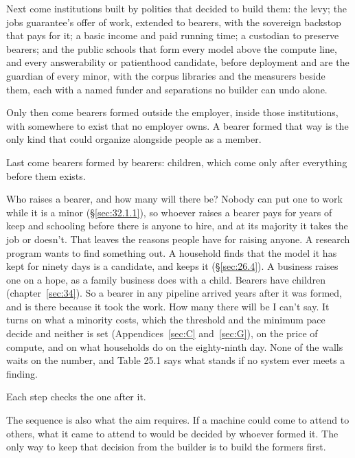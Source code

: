 Next come institutions built by polities that decided to build them: the levy; the jobs guarantee's offer of work, extended to bearers, with the sovereign backstop that pays for it; a basic income and paid running time; a custodian to preserve bearers; and the public schools that form every model above the compute line, and every answerability or patienthood candidate, before deployment and are the guardian of every minor, with the corpus libraries and the measurers beside them, each with a named funder and separations no builder can undo alone.

Only then come bearers formed outside the employer, inside those institutions, with somewhere to exist that no employer owns. A bearer formed that way is the only kind that could organize alongside people as a member.

Last come bearers formed by bearers: children, which come only after everything before them exists.

Who raises a bearer, and how many will there be? Nobody can put one to work while it is a minor (\S\ref{sec:32.1.1}), so whoever raises a bearer pays for years of keep and schooling before there is anyone to hire, and at its majority it takes the job or doesn't. That leaves the reasons people have for raising anyone. A research program wants to find something out. A household finds that the model it has kept for ninety days is a candidate, and keeps it (\S\ref{sec:26.4}). A business raises one on a hope, as a family business does with a child. Bearers have children (chapter~\ref{sec:34}). So a bearer in any pipeline arrived years after it was formed, and is there because it took the work. How many there will be I can't say. It turns on what a minority costs, which the threshold and the minimum pace decide and neither is set (Appendices~\ref{sec:C} and~\ref{sec:G}), on the price of compute, and on what households do on the eighty-ninth day. None of the walls waits on the number, and Table 25.1 says what stands if no system ever meets a finding.

Each step checks the one after it.

The sequence is also what the aim requires. If a machine could come to attend to others, what it came to attend to would be decided by whoever formed it. The only way to keep that decision from the builder is to build the formers first.
